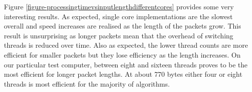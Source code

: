 \documentclass[11pt]{article}
\begin{document}
Figure \ref{figure-processingtimevsinputlengthdifferentcores} provides some very interesting results. As expected, single core implementations are the slowest overall and speed increases are realised as the length of the packets grow. This result is unsurprising as longer packets mean that the overhead of switching threads is reduced over time. Also as expected, the lower thread counts are more efficient for smaller packets but they lose efficiency as the length increases. On our particular test computer, between eight and sixteen threads proves to be the most efficient for longer packet lengths. At about 770 bytes either four or eight threads is most efficient for the majority of algorithms.





\end{document}
